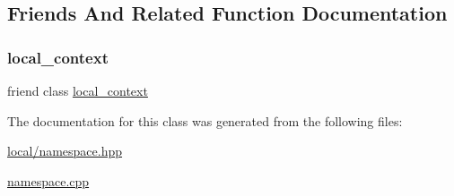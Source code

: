 \subsection{Friends And Related Function Documentation}
\mbox{\label{classtelegraph_1_1local__namespace_a847a7b7b99bad0f0d4efbbc115fd61f5}} 
\subsubsection{\texorpdfstring{local\+\_\+context}{local\_context}}
{\footnotesize\ttfamily friend class \hyperlink{classtelegraph_1_1local__context}{local\+\_\+context}\hspace{0.3cm}{\ttfamily [friend]}}



The documentation for this class was generated from the following files\+:\begin{DoxyCompactItemize}
\item 
\hyperlink{local_2namespace_8hpp}{local/namespace.\+hpp}\item 
\hyperlink{namespace_8cpp}{namespace.\+cpp}\end{DoxyCompactItemize}
